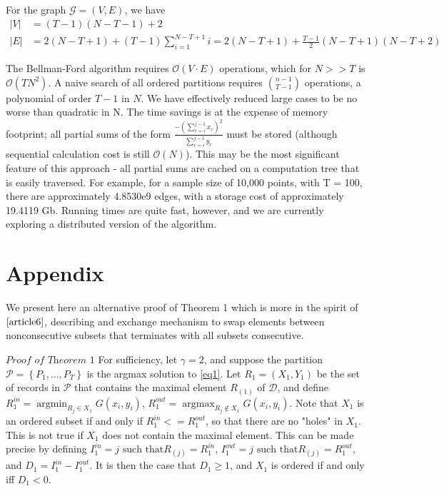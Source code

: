 \documentclass{article}
\theoremstyle{case}
\DeclareMathOperator*{\argmax}{argmax} %
\DeclareMathOperator*{\argmin}{argmin} %
\begin{document}
For the graph $\mathcal{G} = \left( V, E\right)$, we have 
\begin{align*}
\vert V \vert & = \left( T-1\right)\left(N-T-1\right) + 2 \\
\vert E \vert & = 2\left( N-T+1\right) + \left( T-1\right)\sum_{i=1}^{N-T+1} i = 2\left( N-T+1\right) + \frac{T-1}{2}\left( N-T+1\right)\left( N-T+2\right)
\end{align*}

The Bellman-Ford algorithm requires $\mathcal{O}\left( V\cdot E\right)$ operations, which for $N >> T$ is $\mathcal{O}\left( TN^2\right)$. A naive search of all ordered partitions requires $\binom{n-1}{T-1}$ operations, a polynomial of order $T-1$ in $N$. We have effectively reduced large cases to be no worse than quadratic in N. The time savings is at the expense of memory footprint; all partial sums of the form $\frac{-\left(\sum_{r=i}^{j-1} x_r\right)^2}{\sum_{r=i}^{j-1} y_r}$ must be stored (although sequential calculation cost is still $\mathcal{O}\left( N\right)$). This may be the most significant feature of this approach - all partial sums are cached on a computation tree that is easily traversed. For example, for a sample size of 10,000 points, with T = 100, there are approximately 4.8530e9 edges, with a storage cost of approximately 19.4119 Gb. Running times are quite fast, however, and we are currently exploring a distributed version of the algorithm.

\cleardoublepage
\appendix
\section{Appendix}
We present here an alternative proof of Theorem 1 which is more in the spirit of $\cite{article6}$, describing and exchange mechanism to swap elements between nonconsecutive subsets that terminates with all subsets consecutive.

\vspace{6pt}

$\textit{Proof of Theorem 1}$
For sufficiency, let $\gamma = 2$, and suppose the partition $\mathcal{P} = \left\lbrace P_1, \dots, P_T\right\rbrace$ is the argmax solution to \ref{eq1}. Let $R_1 = (X_1, Y_1)$ be the set of records in $\mathcal{P}$ that contains the maximal element $R_{(1)}$ of $\mathcal{D}$, and define $R_1^{in} = \argmin_{R_j \in X_1} G(x_i, y_i)$, $R_1^{out} = \argmax_{R_j \not\in X_1} G(x_i, y_i)$. Note that $X_1$ is an ordered subset if and only if $R_1^{in} <= R_1^{out}$, so that there are no "holes" in $X_1$. This is not true if $X_1$ does not contain the maximal element. This can be made precise by defining $I_1^{in} = j \text{ such that} R_{(j)} = R_1^{in}$, $I_1^{out} = j \text{ such that} R_{(j)} = R_1^{out}$, and $D_1 = I_1^{in} - I_1^{out}$. It is then the case that $D_1 \geq 1$, and $X_1$ is ordered if and only iff $D_1 < 0$.
\end{document}
